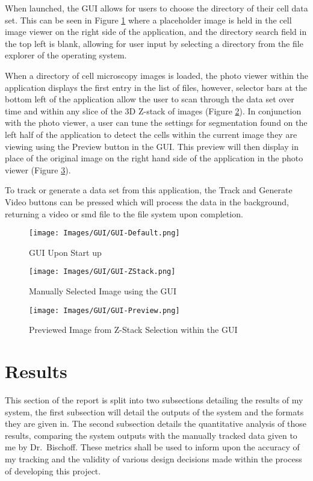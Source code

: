 \documentclass[12pt a4paper]{article}
\begin{document}
When launched, the GUI allows for users to choose the directory of their cell data set. This can be seen in Figure \ref{fig:GUIDEf} where a placeholder image is held in the cell image viewer on the right side of the application, and the directory search field in the top left is blank, allowing for user input by selecting a directory from the file explorer of the operating system.

When a directory of cell microscopy images is loaded, the photo viewer within the application displays the first entry in the list of files, however, selector bars at the bottom left of the application allow the user to scan through the data set over time and within any slice of the 3D Z-stack of images (Figure \ref{fig:zstack-select}). In conjunction with the photo viewer, a user can tune the settings for segmentation found on the left half of the application to detect the cells within the current image they are viewing using the Preview button in the GUI. This preview will then display in place of the original image on the right hand side of the application in the photo viewer (Figure \ref{fig:gui-preview}).

To track or generate a data set from this application, the Track and Generate Video buttons can be pressed which will process the data in the background, returning a video or smd file to the file system upon completion.
\begin{figure}
    \centering
    \texttt{[image: Images/GUI/GUI-Default.png]}
    \caption{GUI Upon Start up}
    \label{fig:GUIDEf}
\end{figure}
\begin{figure}
    \centering
    \texttt{[image: Images/GUI/GUI-ZStack.png]}
    \caption{Manually Selected Image using the GUI}
    \label{fig:zstack-select}
\end{figure}
\begin{figure}
    \centering
    \texttt{[image: Images/GUI/GUI-Preview.png]}
    \caption{Previewed Image from Z-Stack Selection within the GUI}
    \label{fig:gui-preview}
\end{figure}
\newpage
\section{Results} \label{sec:res}
This section of the report is split into two subsections detailing the results of my system, the first subsection will detail the outputs of the system and the formats they are given in. The second subsection details the quantitative analysis of those results, comparing the system outputs with the manually tracked data given to me by Dr.~Bischoff. These metrics shall be used to inform upon the accuracy of my tracking and the validity of various design decisions made within the process of developing this project.
\end{document}
